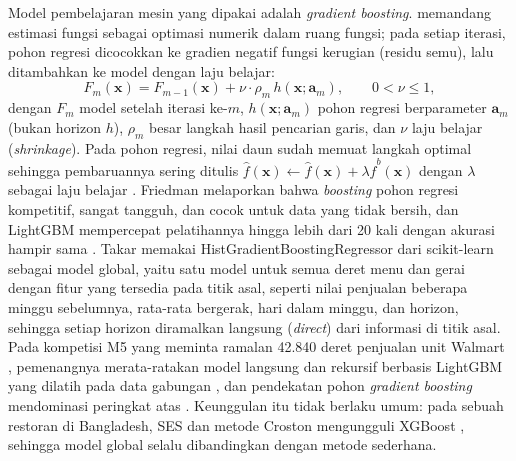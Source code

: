 Model pembelajaran mesin yang dipakai adalah \textit{gradient boosting}. \citet*{friedman2001greedy} memandang estimasi fungsi sebagai optimasi numerik dalam ruang fungsi; pada setiap iterasi, pohon regresi dicocokkan ke gradien negatif fungsi kerugian (residu semu), lalu ditambahkan ke model dengan laju belajar:
\begin{equation}
F_m(\mathbf{x}) = F_{m-1}(\mathbf{x}) + \nu \cdot \rho_m\, h(\mathbf{x}; \mathbf{a}_m), \qquad 0 < \nu \le 1,
\label{eq:gradient-boosting}
\end{equation}
dengan $F_m$ model setelah iterasi ke-$m$, $h(\mathbf{x}; \mathbf{a}_m)$ pohon regresi berparameter $\mathbf{a}_m$ (bukan horizon $h$), $\rho_m$ besar langkah hasil pencarian garis, dan $\nu$ laju belajar (\textit{shrinkage}). Pada pohon regresi, nilai daun sudah memuat langkah optimal sehingga pembaruannya sering ditulis $\hat{f}(\mathbf{x}) \leftarrow \hat{f}(\mathbf{x}) + \lambda \hat{f}^{b}(\mathbf{x})$ dengan $\lambda$ sebagai laju belajar \citep*{james2021introduction}. Friedman melaporkan bahwa \textit{boosting} pohon regresi kompetitif, sangat tangguh, dan cocok untuk data yang tidak bersih, dan LightGBM mempercepat pelatihannya hingga lebih dari 20 kali dengan akurasi hampir sama \citep{ke2017lightgbm}. Takar memakai HistGradientBoostingRegressor dari scikit-learn \citep{pedregosa2011scikitlearn} sebagai model global, yaitu satu model untuk semua deret menu dan gerai dengan fitur yang tersedia pada titik asal, seperti nilai penjualan beberapa minggu sebelumnya, rata-rata bergerak, hari dalam minggu, dan horizon, sehingga setiap horizon diramalkan langsung (\textit{direct}) dari informasi di titik asal. Pada kompetisi M5 yang meminta ramalan 42.840 deret penjualan unit Walmart \citep*{makridakis2022m5}, pemenangnya merata-ratakan model langsung dan rekursif berbasis LightGBM yang dilatih pada data gabungan \citep*{in2022simple}, dan pendekatan pohon \textit{gradient boosting} mendominasi peringkat atas \citep{januschowski2022forecasting}. Keunggulan itu tidak berlaku umum: pada sebuah restoran di Bangladesh, SES dan metode Croston mengungguli XGBoost \citep*{hossain2025comparative}, sehingga model global selalu dibandingkan dengan metode sederhana.

